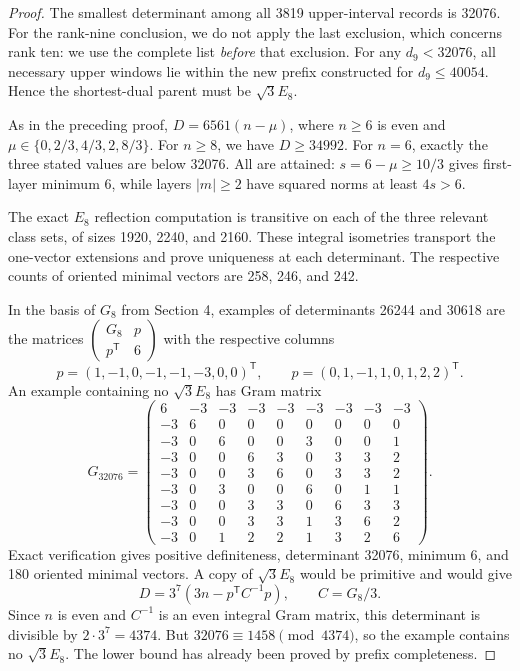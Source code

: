 \documentclass[11pt,a4paper]{article}
\theoremstyle{remark}\newtheorem{remark}[theorem]{Remark}
\begin{document}
\begin{proof}
The smallest determinant among all 3819 upper-interval records is 32076. For the rank-nine conclusion, we do not apply the last exclusion, which concerns rank ten: we use the complete list \emph{before} that exclusion. For any $d_9<32076$, all necessary upper windows lie within the new prefix constructed for $d_9\le40054$. Hence the shortest-dual parent must be $\sqrt3E_8$.

As in the preceding proof, $D=6561(n-\mu)$, where $n\ge6$ is even and $\mu\in\{0,2/3,4/3,2,8/3\}$. For $n\ge8$, we have $D\ge34992$. For $n=6$, exactly the three stated values are below 32076. All are attained: $s=6-\mu\ge10/3$ gives first-layer minimum 6, while layers $|m|\ge2$ have squared norms at least $4s>6$.

The exact $E_8$ reflection computation is transitive on each of the three relevant class sets, of sizes 1920, 2240, and 2160. These integral isometries transport the one-vector extensions and prove uniqueness at each determinant. The respective counts of oriented minimal vectors are 258, 246, and 242.

In the basis of $G_8$ from Section 4, examples of determinants 26244 and 30618 are the matrices $\left(\begin{smallmatrix}G_8&p\\p^{\mathsf T}&6\end{smallmatrix}\right)$ with the respective columns
\[
p=(1,-1,0,-1,-1,-3,0,0)^{\mathsf T},\qquad
p=(0,1,-1,1,0,1,2,2)^{\mathsf T}.
\]
An example containing no $\sqrt3E_8$ has Gram matrix
\[
G_{32076}=
\begin{pmatrix}
6&-3&-3&-3&-3&-3&-3&-3&-3\\
-3&6&0&0&0&0&0&0&0\\
-3&0&6&0&0&3&0&0&1\\
-3&0&0&6&3&0&3&3&2\\
-3&0&0&3&6&0&3&3&2\\
-3&0&3&0&0&6&0&1&1\\
-3&0&0&3&3&0&6&3&3\\
-3&0&0&3&3&1&3&6&2\\
-3&0&1&2&2&1&3&2&6
\end{pmatrix}.
\]
Exact verification gives positive definiteness, determinant 32076, minimum 6, and 180 oriented minimal vectors. A copy of $\sqrt3E_8$ would be primitive and would give
\[
D=3^7(3n-p^{\mathsf T}C^{-1}p),\qquad C=G_8/3.
\]
Since $n$ is even and $C^{-1}$ is an even integral Gram matrix, this determinant is divisible by $2\cdot3^7=4374$. But $32076\equiv1458\pmod{4374}$, so the example contains no $\sqrt3E_8$. The lower bound has already been proved by prefix completeness.
\end{proof}
\end{document}
